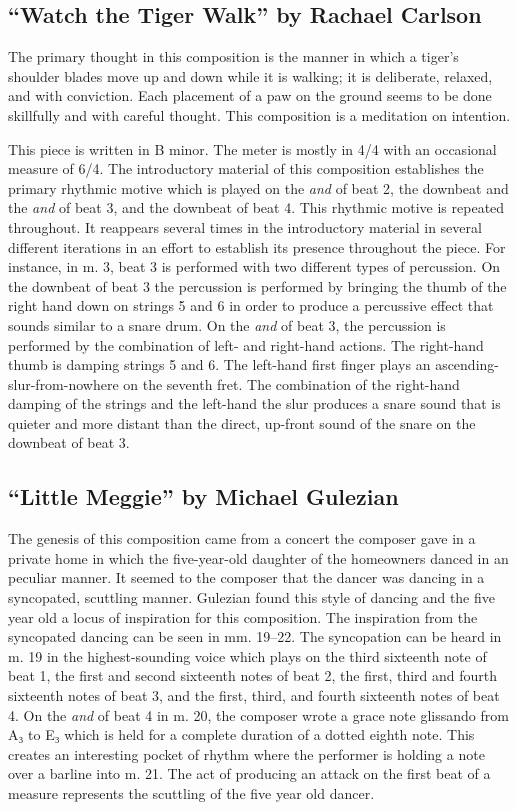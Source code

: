 \documentclass{tufte-handout}
\begin{document}
\subsection*{``Watch the Tiger Walk'' by Rachael Carlson}
\label{sec:watch-tiger-walk}
The primary thought in this composition is the manner in which a tiger's shoulder blades move up and down while it is walking; it is deliberate, relaxed, and with conviction. Each placement of a paw on the ground seems to be done skillfully and with careful thought. This composition is a meditation on intention.

This piece is written in B minor. The meter is mostly in 4/4 with an
occasional measure of 6/4. The introductory material of this composition
establishes the primary rhythmic motive which is played on the \emph{and} of
beat 2, the downbeat and the \emph{and} of beat 3, and the downbeat of beat
4. This rhythmic motive is repeated throughout. It reappears
several times in the introductory material in several different iterations in an
effort to establish its presence throughout the piece. For instance, in m. 3,
beat 3 is performed with two different types of percussion. On the downbeat of
beat 3 the percussion is performed by bringing the thumb of the right hand
down on strings 5 and 6 in order to produce a percussive effect that sounds
similar to a snare drum. On the \emph{and} of beat 3, the percussion is
performed by the combination of left- and right-hand actions. The right-hand
thumb is damping strings 5 and 6. The left-hand first finger plays an
ascending-slur-from-nowhere on the seventh fret. The combination of the
right-hand damping of the strings and the left-hand the slur produces a snare sound that is quieter and more distant than the direct, up-front sound of the snare on the downbeat of beat 3.

\subsection*{``Little Meggie'' by Michael Gulezian}
\label{sec:little-megg-rach}
The genesis of this composition came from a concert the composer gave in a private home in which the five-year-old daughter of the homeowners danced in an peculiar manner. It seemed to the composer that the dancer was dancing in a syncopated, scuttling manner. Gulezian found this style of dancing and the five year old a locus of inspiration for this composition. The inspiration from the syncopated dancing can be seen in mm. 19–22. The syncopation can be heard in m. 19 in the highest-sounding voice which plays on the third sixteenth note of beat 1, the first and second sixteenth notes of beat 2, the first, third and fourth sixteenth notes of beat 3, and the first, third, and fourth sixteenth notes of beat 4. On the \emph{and} of beat 4 in m. 20, the composer wrote a grace note glissando from A₃ to E₃ which is held for a complete duration of a dotted eighth note. This creates an interesting pocket of rhythm where the performer is holding a note over a barline into m. 21. The act of producing an attack on the first beat of a measure represents the scuttling of the five year old dancer.
\end{document}
